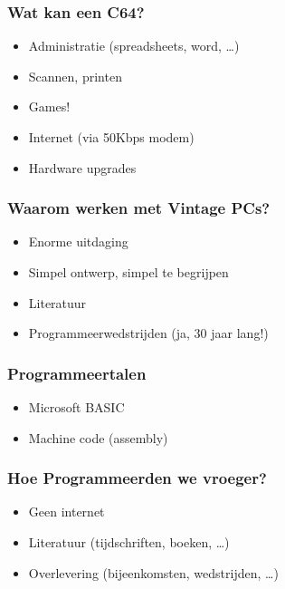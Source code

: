\documentclass[aspectratio=43]{uva-inf-presentation}
\begin{document}

\begin{frame}
\frametitle{Wat kan een C64?}

\begin{itemize}
\item Administratie (spreadsheets, word, \dots)
\item Scannen, printen
\item Games!
\item Internet (via 50Kbps modem)
\item Hardware upgrades
\end{itemize}

\end{frame}


\begin{frame}
\frametitle{Waarom werken met Vintage PCs?}

\begin{itemize}
\item Enorme uitdaging
\item Simpel ontwerp, simpel te begrijpen
\item Literatuur
\item Programmeerwedstrijden (ja, 30 jaar lang!)
\end{itemize}

\end{frame}


\begin{frame}
\frametitle{Programmeertalen}

\begin{itemize}
\item Microsoft BASIC
\item Machine code (assembly)
\end{itemize}

\end{frame}


\begin{frame}
\frametitle{Hoe Programmeerden we vroeger?}

\begin{itemize}
\item Geen internet
\item Literatuur (tijdschriften, boeken, \dots)
\item Overlevering (bijeenkomsten, wedstrijden, \dots)
\end{itemize}

\end{frame}
\end{document}
